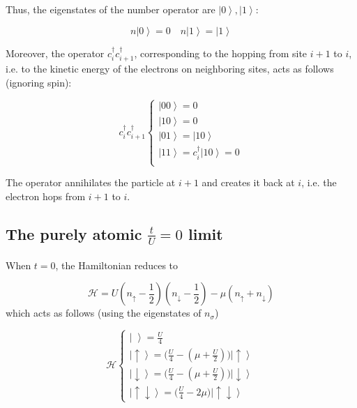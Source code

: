 Thus, the eigenstates of the number operator are $\left| 0 \right\rangle, \left| 1 \right\rangle$:

\begin{equation}
n \left| 0 \right\rangle = 0 \quad n \left| 1 \right\rangle = \left| 1 \right\rangle
\end{equation}

Moreover, the operator $c_i^\dagger c_{i+1}^\dagger$, corresponding to the hopping from site $i+1$ to $i$, i.e. to the kinetic energy of the electrons on neighboring sites, acts as follows (ignoring spin):

\begin{equation}
c_i^\dagger c_{i+1}^\dagger \begin{cases}
\left|0 0 \right\rangle = 0 \\
\left|1 0 \right\rangle =  0 \\
\left|0 1 \right\rangle =  \left| 1 0 \right\rangle \\
\left|1 1 \right\rangle =  c_i^\dagger \left| 1 0  \right\rangle = 0 \\
\end{cases}
\end{equation}

The operator annihilates the particle at $i+1$ and creates it back at $i$, i.e. the electron hops from $i+1$ to $i$.

\subsection{The purely atomic $\frac{t}{U} = 0$ limit}\paragraph{}

When $t = 0$, the Hamiltonian reduces to 

\begin{equation}
\mathcal{H} = U (n_\uparrow - \frac{1}{2} ) (n_\downarrow - \frac{1}{2} ) - \mu ( n_\uparrow + n_\downarrow )
\end{equation}
which acts as follows (using the eigenstates of $n_\sigma$)

\begin{equation}
\mathcal{H} \begin{cases}
\left| \,\, \right\rangle = \frac{U}{4} \\
\left| \uparrow \right\rangle = \bigg( \frac{U}{4} - (\mu + \frac{U}{2} ) \bigg) \left| \uparrow \right\rangle \\
\left| \downarrow \right\rangle = \bigg( \frac{U}{4} - (\mu + \frac{U}{2} ) \bigg) \left| \downarrow \right\rangle \\
\left| \uparrow \downarrow \right\rangle = \bigg( \frac{U}{4} - 2 \mu \bigg) \left| \uparrow \downarrow \right\rangle
\end{cases}
\end{equation}

